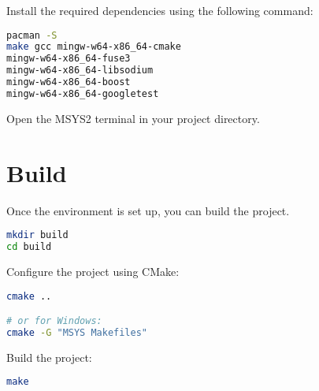 Install the required dependencies using the following command:
\begin{lstlisting}[language=bash, basicstyle=\ttfamily\small]
pacman -S
make gcc mingw-w64-x86_64-cmake
mingw-w64-x86_64-fuse3
mingw-w64-x86_64-libsodium
mingw-w64-x86_64-boost
mingw-w64-x86_64-googletest
\end{lstlisting}

Open the MSYS2 terminal in your project directory.

\section{Build}\label{sec:build}

Once the environment is set up, you can build the project.

\begin{lstlisting}[language=bash, basicstyle=\ttfamily\small]
mkdir build
cd build
\end{lstlisting}

Configure the project using CMake:
\begin{lstlisting}[language=bash, basicstyle=\ttfamily\small]
cmake ..

# or for Windows:
cmake -G "MSYS Makefiles"
\end{lstlisting}

Build the project:
\begin{lstlisting}[language=bash, basicstyle=\ttfamily\small]
make
\end{lstlisting}

